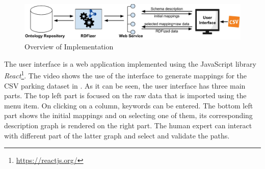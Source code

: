 \begin{figure}[h]
	\centering
	\includegraphics[scale=0.55]{images/OverviewImplementation.pdf}
	\caption{Overview of Implementation}
	\label{fig:OverviewImplementation}
\end{figure}

The user interface is a web application implemented using the JavaScript library \emph{React}\footnote{\url{https://reactjs.org/}}. The video shows the use of the interface to generate mappings for the CSV parking dataset in . As it can be seen, the user interface has three main parts. The top left part is focused on the raw data that is imported using the  menu item. On clicking on a column, keywords can be entered. The bottom left part shows the initial mappings and on selecting one of them, its corresponding description graph is rendered on the right part. The human expert can interact with different part of the latter graph and select and validate the paths. 

